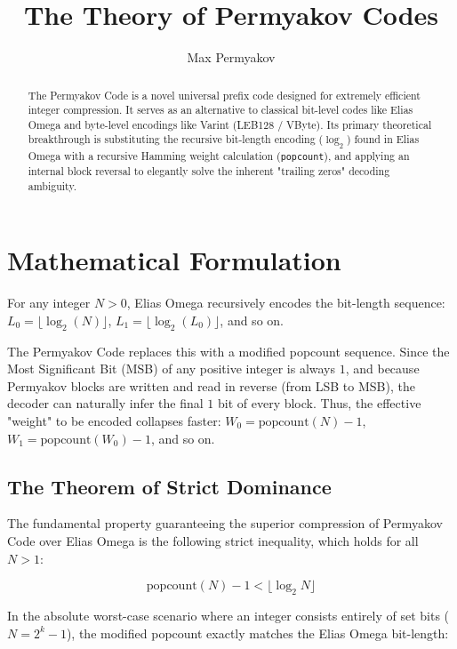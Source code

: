 \documentclass[12pt,a4paper]{article}
\title{The Theory of Permyakov Codes}
\author{Max Permyakov}
\date{}
\begin{document}
\maketitle

\begin{abstract}
The Permyakov Code is a novel universal prefix code designed for extremely efficient integer compression. It serves as an alternative to classical bit-level codes like Elias Omega and byte-level encodings like Varint (LEB128 / VByte). Its primary theoretical breakthrough is substituting the recursive bit-length encoding ($\log_2$) found in Elias Omega with a recursive Hamming weight calculation (\texttt{popcount}), and applying an internal block reversal to elegantly solve the inherent "trailing zeros" decoding ambiguity.
\end{abstract}

\section{Mathematical Formulation}

For any integer $N > 0$, Elias Omega recursively encodes the bit-length sequence:
$L_0 = \lfloor\log_2(N)\rfloor$, $L_1 = \lfloor\log_2(L_0)\rfloor$, and so on.

The Permyakov Code replaces this with a modified popcount sequence. Since the Most Significant Bit (MSB) of any positive integer is always $1$, and because Permyakov blocks are written and read in reverse (from LSB to MSB), the decoder can naturally infer the final $1$ bit of every block. Thus, the effective "weight" to be encoded collapses faster:
$W_0 = \text{popcount}(N) - 1$, $W_1 = \text{popcount}(W_0) - 1$, and so on.

\subsection{The Theorem of Strict Dominance}

The fundamental property guaranteeing the superior compression of Permyakov Code over Elias Omega is the following strict inequality, which holds for all $N > 1$:

\begin{equation}
\text{popcount}(N) - 1 < \lfloor\log_2 N\rfloor
\end{equation}

In the absolute worst-case scenario where an integer consists entirely of set bits ($N = 2^k - 1$), the modified popcount exactly matches the Elias Omega bit-length:
\end{document}
